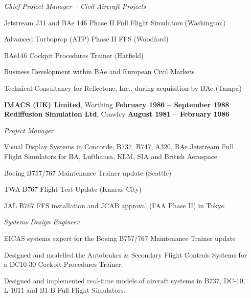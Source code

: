 \documentclass[10pt]{article}
\newenvironment{outerlist}[1][\enskip\textbullet]%
        {\begin{itemize}[#1]}{\end{itemize}%
         \vspace{-.6\baselineskip}}
\newenvironment{innerlist}[1][\enskip\textbullet]%
        {\begin{compactitem}[#1]}{\end{compactitem}}
\newcommand{\blankline}{\quad\pagebreak[2]}
\begin{document}
\begin{innerlist}

\item[] \textit{Chief Project Manager -- Civil Aircraft Projects}%
\begin{innerlist}
\item Jetstream J31 and BAe 146 Phase II Full Flight Simulators (Washington)
\item Advanced Turboprop (ATP) Phase II FFS (Woodford)
\item BAe146 Cockpit Procedures Trainer (Hatfield)
\item Business Development within BAe and European Civil Markets
\item Technical Consultancy for Reflectone, Inc., during acquisition by BAe (Tampa)

\end{innerlist}

\end{innerlist}

\blankline

\textbf{IMACS (UK) Limited}, Worthing        \hfill \textbf{February 1986 -- September 1988}\\
\textbf{Rediffusion Simulation Ltd}, Crawley        \hfill \textbf{August 1981 -- February 1986}

\begin{outerlist}
\item[] \textit{Project Manager}%
	\begin{innerlist}
	\item Visual Display Systems in Concorde, B737, B747, A320, BAe Jetstream Full Flight Simulators for BA, Lufthansa, KLM, SIA and British Aerospace
	\item Boeing B757/767 Maintenance Trainer update (Seattle)
	\item TWA B767 Flight Test Update (Kansas City)
	\item JAL B767 FFS installation and JCAB approval (FAA Phase II) in Tokyo
	\end{innerlist}

\item[] \textit{Systems Design Engineer} %
	\begin{innerlist}
	\item EICAS systems expert for the Boeing B757/767 Maintenance Trainer update
	\item Designed and modelled the Autobrakes \& Secondary Flight Controls Systems for a DC10-30 Cockpit Procedures Trainer.
	\item Designed and implemented real-time models of aircraft systems in B737, DC-10, L-1011 and B1-B Full Flight Simulators.
	\end{innerlist}
\end{outerlist}
\end{document}
